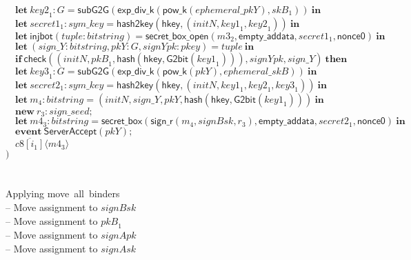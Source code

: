 \documentclass{article}
\newcommand{\coutput}[2]{\overline{#1}\langle{#2}\rangle}
\newcommand{\kw}[1]{\mathbf{#1}}
\newcommand{\kwf}[1]{\mathsf{#1}}
\newcommand{\var}[1]{\mathit{#1}}
\newcommand{\kwt}[1]{\mathit{#1}}
\newcommand{\kwc}[1]{\mathit{#1}}
\begin{document}
\begin{tabbing}
\>$\quad \kw{let}\ \var{key2}_{1}: \kwt{G} = \kwf{subG2G}(\kwf{exp{\_}div{\_}k}(\kwf{pow{\_}k}(\var{ephemeral{\_}pkY}), \var{skB}_{1}))\ \kw{in}$\\
\>$\quad \kw{let}\ \var{secret1}_{1}: \kwt{sym{\_}key} = \kwf{hash2key}(\kwf{hkey}, \kwf{}(\var{initN}, \var{key1}_{1}, \var{key2}_{1}))\ \kw{in}$\\
\>$\quad \kw{let}\ \kwf{injbot}(\var{tuple}: \kwt{bitstring}) = \kwf{secret{\_}box{\_}open}(\var{m3}_{2}, \kwf{empty{\_}addata}, \var{secret1}_{1}, \kwf{nonce0})\ \kw{in}$\\
\>$\quad \kw{let}\ \kwf{}(\var{sign{\_}Y}: \kwt{bitstring}, \var{pkY}: \kwt{G}, \var{signYpk}: \kwt{pkey}) = \var{tuple}\ \kw{in}$\\
\>$\quad \kw{if}\ \kwf{check}(\kwf{}(\var{initN}, \var{pkB}_{1}, \kwf{hash}(\kwf{hkey}, \kwf{G2bit}(\var{key1}_{1}))), \var{signYpk}, \var{sign{\_}Y})\ \kw{then}$\\
\>$\quad \kw{let}\ \var{key3}_{1}: \kwt{G} = \kwf{subG2G}(\kwf{exp{\_}div{\_}k}(\kwf{pow{\_}k}(\var{pkY}), \var{ephemeral{\_}skB}))\ \kw{in}$\\
\>$\quad \kw{let}\ \var{secret2}_{1}: \kwt{sym{\_}key} = \kwf{hash2key}(\kwf{hkey}, \kwf{}(\var{initN}, \var{key1}_{1}, \var{key2}_{1}, \var{key3}_{1}))\ \kw{in}$\\
\>$\quad \kw{let}\ \var{m}_{4}: \kwt{bitstring} = \kwf{}(\var{initN}, \var{sign{\_}Y}, \var{pkY}, \kwf{hash}(\kwf{hkey}, \kwf{G2bit}(\var{key1}_{1})))\ \kw{in}$\\
\>$\quad \kw{new}\ \var{r}_{3}: \kwt{sign{\_}seed};$\\
\>$\quad \kw{let}\ \var{m4}_{3}: \kwt{bitstring} = \kwf{secret{\_}box}(\kwf{sign{\_}r}(\var{m}_{4}, \var{signBsk}, \var{r}_{3}), \kwf{empty{\_}addata}, \var{secret2}_{1}, \kwf{nonce0})\ \kw{in}$\\
\>$\quad \kw{event}\ \kwf{ServerAccept}(\var{pkY});$\\
\>$\quad \coutput{\kwc{c8}[\var{i}_{1}]}{\var{m4}_{3}}$\\
\>$)$\\
\\
\\
Applying move\ all\ binders\\
\quad -- Move assignment to $\var{signBsk}$\\
\quad -- Move assignment to $\var{pkB}_{1}$\\
\quad -- Move assignment to $\var{signApk}$\\
\quad -- Move assignment to $\var{signAsk}$\\

\end{tabbing}
\end{document}

